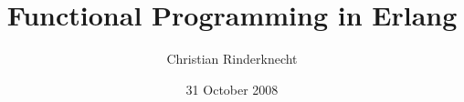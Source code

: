 \documentclass[compress,dvips,xcolor={dvipsnames},t]{beamer}
\title{Functional Programming in Erlang}
\author{Christian Rinderknecht}
\date{31 October 2008}
\begin{document}
\frame{\maketitle}

%




\end{document}
